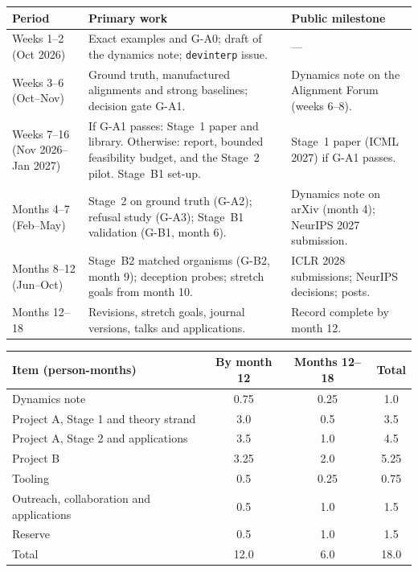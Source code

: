 \documentclass[11pt,a4paper]{article}
\begin{document}
\begin{center}
\begin{tabular}{@{}P{2.4cm}P{8.1cm}P{4.4cm}@{}}
\toprule
Period & Primary work & Public milestone \\
\midrule
Weeks 1--2 (Oct 2026) & Exact examples and G-A0; draft of the dynamics
note; \texttt{devinterp} issue. & --- \\
Weeks 3--6 (Oct--Nov) & Ground truth, manufactured alignments and strong
baselines; decision gate G-A1. & Dynamics note on the Alignment Forum
(weeks 6--8). \\
Weeks 7--16 (Nov 2026--Jan 2027) & If G-A1 passes: Stage~1 paper and library. Otherwise: report, bounded feasibility budget, and the Stage~2 pilot. Stage~B1 set-up. & Stage~1 paper (ICML 2027) if G-A1 passes. \\
Months 4--7 (Feb--May) & Stage~2 on ground truth (G-A2); refusal study
(G-A3); Stage~B1 validation (G-B1, month 6). & Dynamics note on arXiv
(month 4); NeurIPS 2027 submission. \\
Months 8--12 (Jun--Oct) & Stage~B2 matched organisms (G-B2, month 9);
deception probes; stretch goals from month 10. & ICLR 2028 submissions;
NeurIPS decisions; posts. \\
Months 12--18 & Revisions, stretch goals, journal versions, talks and
applications. & Record complete by month 12. \\
\bottomrule
\end{tabular}
\end{center}

\begin{center}
\begin{tabular}{@{}lccc@{}}
\toprule
Item (person-months) & By month 12 & Months 12--18 & Total \\
\midrule
Dynamics note & 0.75 & 0.25 & 1.0 \\
Project A, Stage 1 and theory strand & 3.0 & 0.5 & 3.5 \\
Project A, Stage 2 and applications & 3.5 & 1.0 & 4.5 \\
Project B & 3.25 & 2.0 & 5.25 \\
Tooling & 0.5 & 0.25 & 0.75 \\
Outreach, collaboration and applications & 0.5 & 1.0 & 1.5 \\
Reserve & 0.5 & 1.0 & 1.5 \\
\midrule
Total & 12.0 & 6.0 & 18.0 \\
\bottomrule
\end{tabular}
\end{center}
\end{document}
